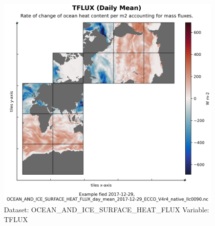 \begin{figure}[H]
\centering
\includegraphics[width=\textwidth]{../images/plots/native_plots/Ocean_and_Sea-Ice_Surface_Heat_Fluxes/TFLUX.png}
\caption{Dataset: OCEAN\_AND\_ICE\_SURFACE\_HEAT\_FLUX Variable: TFLUX}
\label{tab:table-OCEAN_AND_ICE_SURFACE_HEAT_FLUX_TFLUX-Plot}
\end{figure}
\pagebreak
